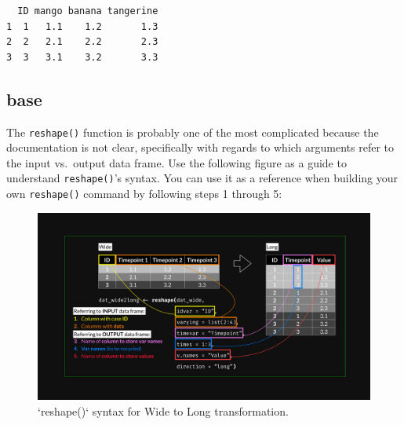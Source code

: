 \documentclass[
]{book}
\begin{document}
\begin{verbatim}
  ID mango banana tangerine
1  1   1.1    1.2       1.3
2  2   2.1    2.2       2.3
3  3   3.1    3.2       3.3
\end{verbatim}

\hypertarget{base}{%
\subsection{base}\label{base}}

The \texttt{reshape()} function is probably one of the most complicated because the documentation is not clear, specifically with regards to which arguments refer to the input vs.~output data frame. Use the following figure as a guide to understand \texttt{reshape()}'s syntax. You can use it as a reference when building your own \texttt{reshape()} command by following steps 1 through 5:

\begin{figure}

{\centering \includegraphics[width=1\linewidth]{R_reshape_wide2long} 

}

\caption{`reshape()` syntax for Wide to Long transformation.}\label{fig:wideLongSyntax}
\end{figure}
\end{document}
